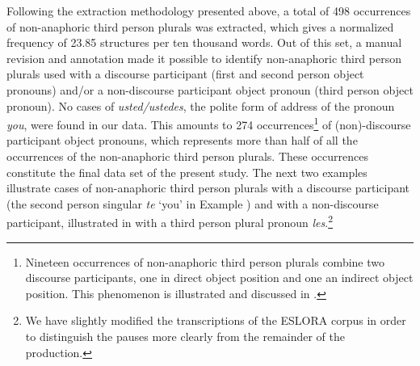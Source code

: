 \documentclass[output=paper]{langscibook}
\begin{document}
Following the extraction methodology presented above, a total of 498 occurrences of non-anaphoric third person plurals was extracted, which gives a normalized frequency of 23.85 structures per ten thousand words. Out of this set, a manual revision and annotation made it possible to identify non-anaphoric third person plurals used with a discourse participant (first and second person object pronouns) and/or a non-discourse participant object pronoun (third person object pronoun). No cases of \textit{usted/ustedes}, the polite form of address of the pronoun \textit{you}, were found in our data. This amounts to 274 occurrences\footnote{Nineteen occurrences of non-anaphoric third person plurals combine two discourse participants, one in direct object position and one an indirect object position. This phenomenon is illustrated and discussed in .} of (non)-discourse participant object pronouns, which represents more than half of all the occurrences of the non-anaphoric third person plurals. These occurrences constitute the final data set of the present study. The next two examples illustrate cases of non-anaphoric third person plurals with a discourse participant (the second person singular \textit{te} ‘you’ in Example ) and with a non-discourse participant, illustrated in  with a third person plural pronoun \textit{les}.\footnote{We have slightly modified the transcriptions of the ESLORA corpus in order to distinguish the pauses more clearly from the remainder of the production.}
\end{document}
